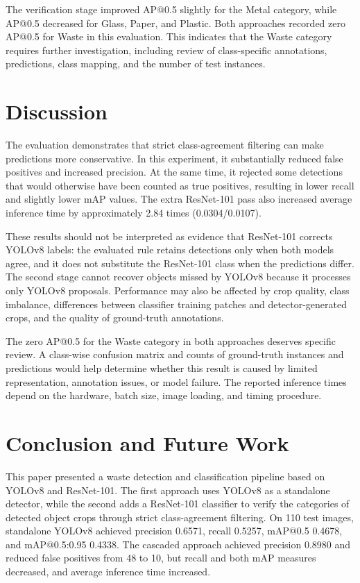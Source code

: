 \documentclass[conference]{IEEEtran}
\begin{document}
The verification stage improved AP@0.5 slightly for the Metal category, while AP@0.5 decreased for Glass, Paper, and Plastic. Both approaches recorded zero AP@0.5 for Waste in this evaluation. This indicates that the Waste category requires further investigation, including review of class-specific annotations, predictions, class mapping, and the number of test instances.

\section{Discussion}
The evaluation demonstrates that strict class-agreement filtering can make predictions more conservative. In this experiment, it substantially reduced false positives and increased precision. At the same time, it rejected some detections that would otherwise have been counted as true positives, resulting in lower recall and slightly lower mAP values. The extra ResNet-101 pass also increased average inference time by approximately 2.84 times (0.0304/0.0107).

These results should not be interpreted as evidence that ResNet-101 corrects YOLOv8 labels: the evaluated rule retains detections only when both models agree, and it does not substitute the ResNet-101 class when the predictions differ. The second stage cannot recover objects missed by YOLOv8 because it processes only YOLOv8 proposals. Performance may also be affected by crop quality, class imbalance, differences between classifier training patches and detector-generated crops, and the quality of ground-truth annotations.

The zero AP@0.5 for the Waste category in both approaches deserves specific review. A class-wise confusion matrix and counts of ground-truth instances and predictions would help determine whether this result is caused by limited representation, annotation issues, or model failure. The reported inference times depend on the hardware, batch size, image loading, and timing procedure.

\section{Conclusion and Future Work}
This paper presented a waste detection and classification pipeline based on YOLOv8 and ResNet-101. The first approach uses YOLOv8 as a standalone detector, while the second adds a ResNet-101 classifier to verify the categories of detected object crops through strict class-agreement filtering. On 110 test images, standalone YOLOv8 achieved precision 0.6571, recall 0.5257, mAP@0.5 0.4678, and mAP@0.5:0.95 0.4338. The cascaded approach achieved precision 0.8980 and reduced false positives from 48 to 10, but recall and both mAP measures decreased, and average inference time increased.
\end{document}
